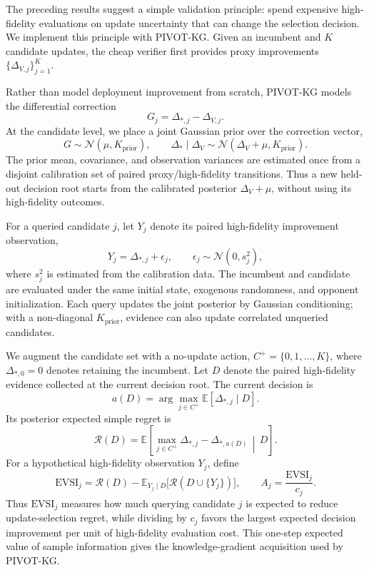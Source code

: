 \documentclass{article}
\newcommand{\E}{\mathbb{E}}
\begin{document}
The preceding results suggest a simple validation principle: spend expensive
high-fidelity evaluations on update uncertainty that can change the selection
decision. We implement this principle with PIVOT-KG. Given an incumbent and
$K$ candidate updates, the cheap verifier first provides proxy improvements
$\{\Delta_{V,j}\}_{j=1}^K$.

Rather than model deployment improvement from scratch, PIVOT-KG models the
differential correction
\begin{equation}
  G_j=\Delta_{*,j}-\Delta_{V,j}.
\end{equation}
At the candidate level, we place a joint Gaussian prior over the correction
vector,
\begin{equation}
  G\sim\mathcal N(\mu,K_{\mathrm{prior}}),\qquad
  \Delta_*\mid\Delta_V\sim
  \mathcal N(\Delta_V+\mu,K_{\mathrm{prior}}).
\end{equation}
The prior mean, covariance, and observation variances are estimated once from
a disjoint calibration set of paired proxy/high-fidelity transitions. Thus a
new held-out decision root starts from the calibrated posterior
$\Delta_V+\mu$, without using its high-fidelity outcomes.

For a queried candidate $j$, let $Y_j$ denote its paired high-fidelity
improvement observation,
\begin{equation}
  Y_j=\Delta_{*,j}+\epsilon_j,
  \qquad
  \epsilon_j\sim\mathcal N(0,s_j^2),
\end{equation}
where $s_j^2$ is estimated from the calibration data. The incumbent and
candidate are evaluated under the same initial state, exogenous randomness,
and opponent initialization. Each query updates the joint posterior by
Gaussian conditioning; with a non-diagonal $K_{\mathrm{prior}}$, evidence can
also update correlated unqueried candidates.

We augment the candidate set with a no-update action,
$C^+=\{0,1,\ldots,K\}$, where $\Delta_{*,0}=0$ denotes retaining the
incumbent. Let $D$ denote the paired high-fidelity evidence collected at the
current decision root. The current decision is
\begin{equation}
  a(D)=\arg\max_{j\in C^+}
  \E[\Delta_{*,j}\mid D].
\end{equation}
Its posterior expected simple regret is
\begin{equation}
  \mathcal R(D)=
  \E\left[
    \max_{j\in C^+}\Delta_{*,j}
    -\Delta_{*,a(D)}
    \,\middle|\,D
  \right].
\end{equation}
For a hypothetical high-fidelity observation $Y_j$, define
\begin{equation}
  \mathrm{EVSI}_j
  =
  \mathcal R(D)
  -
  \E_{Y_j\mid D}
  \bigl[\mathcal R(D\cup\{Y_j\})\bigr],
  \qquad
  A_j=\frac{\mathrm{EVSI}_j}{c_j}.
\end{equation}
Thus $\mathrm{EVSI}_j$ measures how much querying candidate $j$ is expected to
reduce update-selection regret, while dividing by $c_j$ favors the largest
expected decision improvement per unit of high-fidelity evaluation cost.
This one-step expected value of sample information gives the
knowledge-gradient acquisition used by PIVOT-KG.
\end{document}

